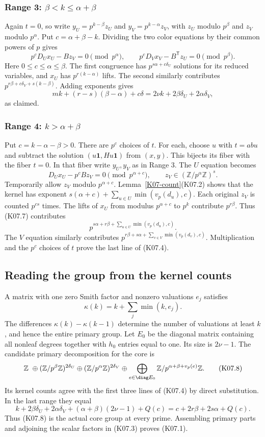 \documentclass[11pt,a4paper]{article}
\theoremstyle{definition}\newtheorem{definition}[theorem]{Definition}
\theoremstyle{remark}\newtheorem{remark}[theorem]{Remark}
\newcommand{\Z}{\mathbb Z}\newcommand{\Q}{\mathbb Q}\newcommand{\F}{\mathbb F}
\numberwithin{equation}{section}
\begin{document}
\subsubsection*{Range 3: $\beta<k\leq\alpha+\beta$}
Again $t=0$, so write $y_U=p^{k-\beta}z_U$ and $y_V=p^{k-\alpha}z_V$, with $z_U$ modulo $p^\beta$ and $z_V$ modulo $p^\alpha$. Put $c=\alpha+\beta-k$. Dividing the two color equations by their common powers of $p$ gives
\[
 p^cD_Ux_U-Bz_V=0\pmod{p^\alpha},\qquad
 p^cD_Vx_V-B^{\mathsf T}z_U=0\pmod{p^\beta}.
\]
Here $0\leq c\leq\alpha\leq\beta$. The first congruence has $p^{s\alpha+c\delta_U}$ solutions for its reduced variables, and $x_U$ has $p^{r(k-\alpha)}$ lifts. The second similarly contributes $p^{r\beta+c\delta_V+s(k-\beta)}$. Adding exponents gives
\[
 mk+(r-s)(\beta-\alpha)+c\delta
 =2\nu k+2\beta\delta_U+2\alpha\delta_V,
\]
as claimed.

\subsubsection*{Range 4: $k>\alpha+\beta$}
Put $c=k-\alpha-\beta>0$. There are $p^c$ choices of $t$. For each, choose $u$ with $t=ab u$ and subtract the solution $(u\boldsymbol1,Hu\boldsymbol1)$ from $(x,y)$. This bijects its fiber with the fiber $t=0$. In that fiber write $y_U,y_V$ as in Range 3. The $U$ equation becomes
\[
 D_Ux_U-p^cBz_V=0\pmod{p^{\alpha+c}},\qquad
 z_V\in(\Z/p^\alpha\Z)^s.                                  \tag{K07.7}
\]
Temporarily allow $z_V$ modulo $p^{\alpha+c}$. Lemma~\ref{K07-count}(K07.2) shows that the kernel has exponent $s(\alpha+c)+\sum_{u\in U}\min(v_p(d_u),c)$. Each original $z_V$ is counted $p^{cs}$ times. The lifts of $x_U$ from modulus $p^{\alpha+c}$ to $p^k$ contribute $p^{r\beta}$. Thus (K07.7) contributes
\[
 p^{s\alpha+r\beta+\sum_{u\in U}\min(v_p(d_u),c)}.
\]
The $V$ equation similarly contributes
$p^{r\beta+s\alpha+\sum_{v\in V}\min(v_p(d_v),c)}$.
Multiplication and the $p^c$ choices of $t$ prove the last line of (K07.4).

\subsection{Reading the group from the kernel counts}\label{K07-sec-5}
A matrix with one zero Smith factor and nonzero valuations $e_j$ satisfies
\[
 \kappa(k)=k+\sum_j\min(k,e_j).
\]
The differences $\kappa(k)-\kappa(k-1)$ determine the number of valuations at least $k$, and hence the entire primary group. Let $E_0$ be the diagonal matrix containing all nonleaf degrees together with $h_0$ entries equal to one. Its size is $2\nu-1$. The candidate primary decomposition for the core is
\[
 \Z\ \oplus(\Z/p^\beta\Z)^{2\delta_U}
 \oplus(\Z/p^\alpha\Z)^{2\delta_V}
 \oplus\bigoplus_{e\in\diag E_0}\Z/p^{\alpha+\beta+v_p(e)}\Z.
                                                                    \tag{K07.8}
\]
Its kernel counts agree with the first three lines of (K07.4) by direct substitution. In the last range they equal
\[
 k+2\beta\delta_U+2\alpha\delta_V
 +(\alpha+\beta)(2\nu-1)+Q(c)
 =c+2r\beta+2s\alpha+Q(c).
\]
Thus (K07.8) is the actual core group at every prime. Assembling primary parts and adjoining the scalar factors in (K07.3) proves (K07.1).
\end{document}
